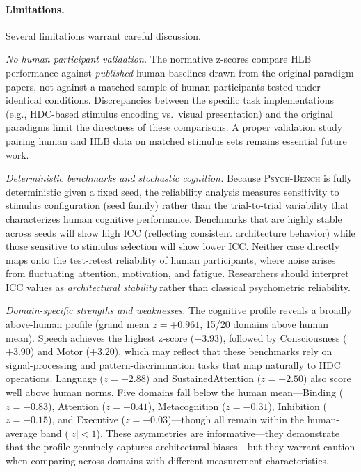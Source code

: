 \documentclass[11pt,letterpaper]{article}
\newcommand{\psychbench}{\textsc{Psych-Bench}}
\newcommand{\hlb}{\textsc{HLB}}
\begin{document}
\paragraph{Limitations.} Several limitations warrant careful discussion.

\emph{No human participant validation.} The normative z-scores compare \hlb{} performance against \emph{published} human baselines drawn from the original paradigm papers, not against a matched sample of human participants tested under identical conditions. Discrepancies between the specific task implementations (e.g., HDC-based stimulus encoding vs.\ visual presentation) and the original paradigms limit the directness of these comparisons. A proper validation study pairing human and \hlb{} data on matched stimulus sets remains essential future work.

\emph{Deterministic benchmarks and stochastic cognition.} Because \psychbench{} is fully deterministic given a fixed seed, the reliability analysis measures sensitivity to stimulus configuration (seed family) rather than the trial-to-trial variability that characterizes human cognitive performance. Benchmarks that are highly stable across seeds will show high ICC (reflecting consistent architecture behavior) while those sensitive to stimulus selection will show lower ICC. Neither case directly maps onto the test-retest reliability of human participants, where noise arises from fluctuating attention, motivation, and fatigue. Researchers should interpret ICC values as \emph{architectural stability} rather than classical psychometric reliability.

\emph{Domain-specific strengths and weaknesses.} The cognitive profile reveals a broadly above-human profile (grand mean $z = +0.961$, 15/20 domains above human mean). Speech achieves the highest z-score ($+3.93$), followed by Consciousness ($+3.90$) and Motor ($+3.20$), which may reflect that these benchmarks rely on signal-processing and pattern-discrimination tasks that map naturally to HDC operations. Language ($z = +2.88$) and SustainedAttention ($z = +2.50$) also score well above human norms. Five domains fall below the human mean---Binding ($z = -0.83$), Attention ($z = -0.41$), Metacognition ($z = -0.31$), Inhibition ($z = -0.15$), and Executive ($z = -0.03$)---though all remain within the human-average band ($|z| < 1$). These asymmetries are informative---they demonstrate that the profile genuinely captures architectural biases---but they warrant caution when comparing across domains with different measurement characteristics.
\end{document}

